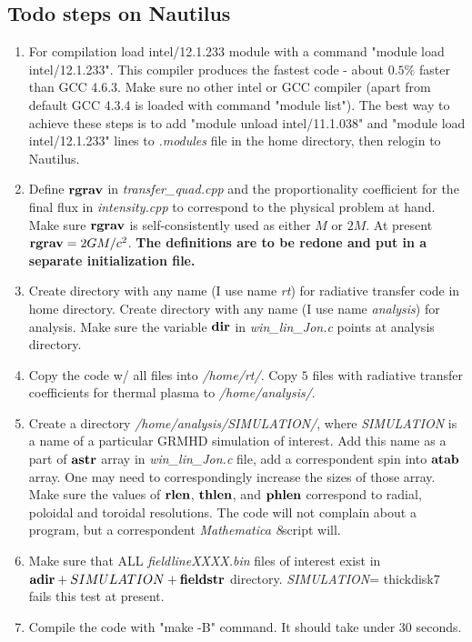 \documentclass{emulateapj}
\newcommand{\mat}{\textit{Mathematica 8}}
\begin{document}
\subsection{Todo steps on Nautilus}
\begin{enumerate}
\item{For compilation load intel/12.1.233 module with a command "module load intel/12.1.233". This compiler produces the fastest code - about $0.5\%$ faster than GCC 4.6.3.
Make sure no other intel or GCC compiler (apart from default GCC 4.3.4 is loaded with command "module list").
The best way to achieve these steps is to add  "module unload intel/11.1.038" and "module load intel/12.1.233" lines to \textit{.modules} file in the home directory,
then relogin to Nautilus.}
\item{Define ${\bf rgrav}$ in \textit{transfer\_quad.cpp} and the proportionality coefficient for the final flux in \textit{intensity.cpp} to correspond to the physical problem at hand.
Make sure ${\bf rgrav}$ is self-consistently used as either $M$ or $2M$. At present ${\bf rgrav}=2GM/c^2$. \textbf{The definitions are to be redone and put in a separate initialization file.}}
\item{Create directory with any name (I use name \textit{rt}) for radiative transfer code in home directory. Create directory with any name (I use name \textit{analysis})
for analysis. Make sure the variable ${\bf dir}$ in \textit{win\_lin\_Jon.c} points at analysis directory.}
\item{Copy the code w/ all files into \textit{/home/rt/}. Copy $5$ files with radiative transfer coefficients for thermal plasma to \textit{/home/analysis/}.}
\item{Create a directory \textit{/home/analysis/SIMULATION/}, where \textit{SIMULATION} is a name of a particular GRMHD simulation of interest.
Add this name as a part of ${\bf astr}$ array in \textit{win\_lin\_Jon.c} file, add a correspondent spin into ${\bf atab}$ array.
One may need to correspondingly increase the sizes of those array. Make sure the values of ${\bf rlen}$, ${\bf thlen}$, and ${\bf phlen}$ correspond to radial,
poloidal and toroidal resolutions. The code will not complain about a program, but a correspondent \mat script will.}
\item{Make sure that ALL \textit{fieldlineXXXX.bin} files of interest exist in ${\bf adir}+ SIMULATION +{\bf fieldstr}$ directory. \textit{SIMULATION}= thickdisk7 fails this test at present.}
\item{Compile the code with "make -B" command. It should take under 30 seconds.}

\end{enumerate}
\end{document}
